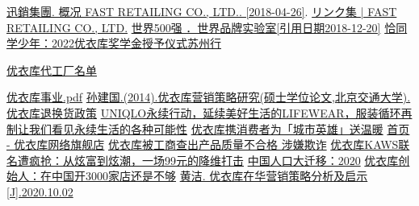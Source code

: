 \documentclass{xjtureport}
\begin{document}
\clearpage
\begin{thebibliography}{99}  
 \href{https://web.archive.org/web/20210124040046/https://www.fastretailing.com/jp/about/company/}{迅銷集團. 概况 FAST RETAILING CO., LTD.. [2018-04-26]}. 
  \href{https://www.fastretailing.com/jp/about/links/}{リンク集 | FAST RETAILING CO., LTD.}
 \href{https://baike.baidu.com/reference/4397542/9ccb-0QL1Cbyq9azCzh6JA2suTV_kom-CcDBaAEnefnbjvKldmwqHsy9q1C5egTSJDXW25uOpkB2khESK5zemczKZuGH0pJm_SvCzphrKaB9MVG5-A}{世界500强   ．世界品牌实验室[引用日期2018-12-20]}
 \href{https://mp.weixin.qq.com/s/D7sGPq8OxnwvS7fyHyUTMg}{恰同学少年：2022优衣库奖学金授予仪式苏州行}

 \href{https://www.fastretailing.com/jp/sustainability/labor/pdf/FRCoreSewingFactoryList.pdf}{优衣库代工厂名单}

 \href{https://www.fastretailing.com/tc/ir/library/pdf/ar2014_tc_07.pdf}{优衣库事业.pdf}
 \href{https://kns.cnki.net/KCMS/detail/detail.aspx?dbname=CMFD201501&filename=1014374415.nh}{孙建国.(2014).优衣库营销策略研究(硕士学位论文,北京交通大学).}
 \href{https://www.uniqlo.com/cn/corp/returnpolicy/}{优衣库退换货政策}
\href{https://www.wantshowlaundry.com/uniqlo/}{UNIQLO永续行动，延续美好生活的LIFEWEAR，服装循环再制让我们看见永续生活的各种可能性}
 \href{https://socialbeta.com/c/9562}{优衣库携消费者为「城市英雄」送温暖}
 \href{https://www.uniqlo.cn/}{首页 - 优衣库网络旗舰店}
 \href{http://gftai.bcpcn.com/articles/525/49019.html}{优衣库被工商查出产品质量不合格 涉嫌欺诈}
 \href{https://www.jiemian.com/article/3189175.html}{优衣库KAWS联名遭疯抢：从炫富到炫潮，一场99元的降维打击}
 \href{https://finance.sina.com.cn/zl/china/2021-06-09/zl-ikqcfnaz9918291.shtml}{中国人口大迁移：2020}
 \href{https://finance.sina.com.cn/chanjing/gsnews/2022-11-30/doc-imqqsmrp8140719.shtml}{优衣库创始人：在中国开3000家店还是不够}
 \href{http://www.ccidanpo.org/sites/default/files/c26636204.2020.10.02.pdf}{黄洁. 优衣库在华营销策略分析及启示[J].2020.10.02}
\end{thebibliography}
\end{document}
